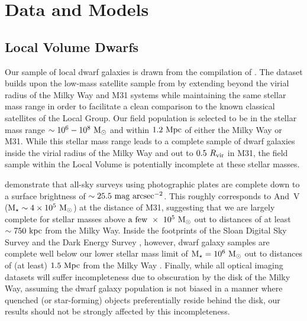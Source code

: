 \section{Data and Models}
\label{sec:data}

\subsection{Local Volume Dwarfs}
\label{subsec:obsdata}

Our sample of local dwarf galaxies is drawn from the compilation of
\citet{mcconnachie12}. The dataset builds upon the low-mass satellite sample
from \citet{fham15} by extending beyond the virial radius of the Milky Way and
M31 systems while maintaining the same stellar mass range in order to facilitate
a clean comparison to the known classical satellites of the Local Group.
%
Our field population is selected to be in the stellar mass range
$\sim 10^{6}-10^{8}~{\rm M}_{\odot}$ and within $1.2~{\rm Mpc}$ of either the Milky Way or
M31.
While this stellar mass range leads to a complete sample of dwarf galaxies
inside the virial radius of the Milky Way and out to $0.5~R_{\rm vir}$ in M31,
the field sample within the Local Volume is potentially incomplete at these
stellar masses.
%





\citet{whiting07} demonstrate that all-sky surveys using photographic plates are
complete down to a surface brightness of
$\sim 25.5~{\rm mag}~{\rm arcsec}^{-2}$.
%
This roughly corresponds to And~V (${\rm M}_{\star} \sim 4\times10^{5}~{\rm M}_{\odot}$) at the
distance of M31, suggesting that we are largely complete for stellar masses
above ${\rm a~few}~\times~10^{5}~{\rm M}_{\odot}$ out to distances of at least
$\sim 750~{\rm kpc}$ from the Milky Way.
%
Inside the footprints of the Sloan Digital Sky Survey \citep{york00} and the
Dark Energy Survey \citep{DES05, DES14}, however, dwarf galaxy samples are
complete well below our lower stellar mass limit of ${\rm M}_{\star} = 10^{6}~{\rm M}_{\odot}$ out
to distances of (at least) $1.5~{\rm Mpc}$ from the Milky Way \citep{koposov08,
  tollerud08, walsh09, jethwa16, newton17}.
Finally, while all optical imaging datasets will suffer incompleteness due to
obscuration by the disk of the Milky Way, assuming the dwarf galaxy population
is not biased in a manner where quenched (or star-forming) objects
preferentially reside behind the disk, our results should not be strongly
affected by this incompleteness.
%






